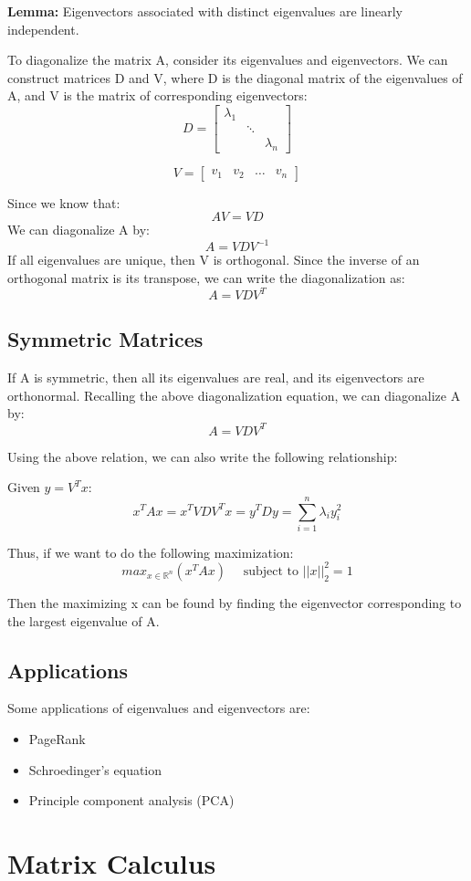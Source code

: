 \documentclass{article}
\begin{document}
\textbf{Lemma:} Eigenvectors associated with distinct eigenvalues are linearly independent.

To diagonalize the matrix A, consider its eigenvalues and eigenvectors. We can construct matrices D and V, where D is the diagonal matrix of the eigenvalues of A, and V is the matrix of corresponding eigenvectors:
$$D=\begin{bmatrix}
    \lambda_1 & & \\
    & \ddots &    \\
    & & \lambda_n
\end{bmatrix}
$$

$$V=\begin{bmatrix}
    v_1 & v_2 & \dots & v_n
\end{bmatrix}
$$

Since we know that:
$$AV=VD$$
We can diagonalize A by:
$$A=VDV^{-1}$$
If all eigenvalues are unique, then V is orthogonal. Since the inverse of an orthogonal matrix is its transpose, we can write the diagonalization as:
$$A=VDV^T$$
\subsection{Symmetric Matrices}
If A is symmetric, then all its eigenvalues are real, and its eigenvectors are orthonormal. Recalling the above diagonalization equation, we can diagonalize A by:
$$A=VDV^T$$

Using the above relation, we can also write the following relationship:

Given $y=V^Tx$:
$$x^TAx=x^TVDV^Tx=y^TDy=\sum_{i=1}^{n} \lambda_i y_i^2$$

Thus, if we want to do the following maximization:
$$ max_{x\in\mathbb{R}^n} (x^TAx) \quad \textrm{ subject to   } ||x||_2^2=1$$

Then the maximizing x can be found by finding the eigenvector corresponding to the largest eigenvalue of A.

\subsection{Applications}
Some applications of eigenvalues and eigenvectors are:
\begin{itemize}
\item PageRank
\item Schroedinger's equation
\item Principle component analysis (PCA)
\end{itemize}
\section{Matrix Calculus}
\end{document}
